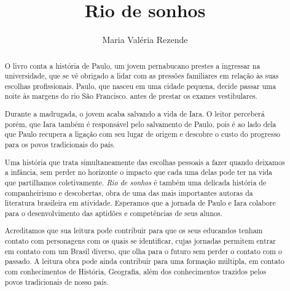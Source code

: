 \documentclass[12pt]{extarticle}
\begin{document}
\newcommand{\AutorLivro}{Maria Valéria Rezende}
\newcommand{\TituloLivro}{Rio de sonhos}
\newcommand{\Tema}{Ficção, mistério e fantasia}
\newcommand{\Genero}{Conto, crônica e novela}
\newcommand{\imagemCapa}{./images/PNLD0051-01.png}
\newcommand{\issnppub}{---}
\newcommand{\issnepub}{---}
\newcommand{\colaborador}{{Raphaella Lira}}

\title{\TituloLivro}
\author{\AutorLivro}
\def\authornotes{\colaborador}

\date{}
\maketitle

\begin{abstract}

O livro conta a história de Paulo, um jovem pernabucano prestes a ingressar na universidade, 
que se vê obrigado a lidar 
com as pressões familiares em relação às suas escolhas profissionais.
Paulo, que nasceu em uma cidade pequena, decide passar uma noite às margens do rio São Francisco.
antes de prestar os exames vestibulares.

Durante a madrugada, o jovem acaba salvando a vida de Iara. 
O leitor perceberá porém, que Iara também é responsável pelo 
salvamento de Paulo, pois é ao
lado dela que Paulo recupera a ligação com seu lugar de origem
e descobre o custo do progresso para os povos tradicionais do
país.

Uma história que trata simultaneamente das escolhas pessoais 
a fazer quando deixamos a infância, sem perder no horizonte
o impacto que cada uma delas pode ter na vida que partilhamos
coletivamente. \emph{Rio de sonhos} é também uma delicada história de
companheirismo e descobertas, obra de uma das mais importantes autoras
da literatura brasileira em atividade. Esperamos que a jornada de Paulo
e Iara colabore para o desenvolvimento das aptidões e competências de
seus alunos.

Acreditamos que sua leitura pode
contribuir para que os seus educandos tenham contato com personagens com os
quais se identificar, cujas jornadas permitem entrar em
contato com um Brasil diverso, que olha para o futuro sem perder o
contato com o passado. A leitura obra pode ainda 
contribuir para uma formação múltipla, em contato com conhecimentos de
História, Geografia, além dos conhecimentos trazidos pelos povos
tradicionais de nosso país.

\end{abstract}
\end{document}
